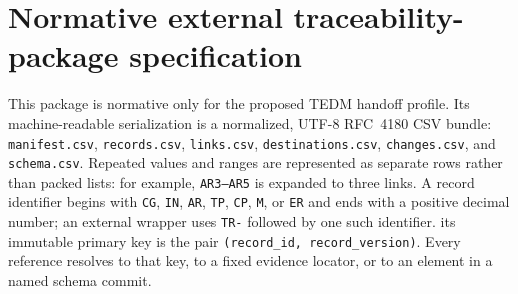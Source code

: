 \documentclass[10pt]{article}
\begin{document}
\clearpage
\section*{Normative external traceability-package specification}
This package is normative only for the proposed TEDM handoff profile. Its
machine-readable serialization is a normalized, UTF-8 RFC~4180 CSV bundle:
\texttt{manifest.csv}, \texttt{records.csv}, \texttt{links.csv},
\texttt{destinations.csv}, \texttt{changes.csv}, and \texttt{schema.csv}.
Repeated values and ranges are represented as separate rows rather than packed
lists: for example, \texttt{AR3--AR5} is expanded to three links. A record
identifier begins with \texttt{CG}, \texttt{IN}, \texttt{AR}, \texttt{TP},
\texttt{CP}, \texttt{M}, or \texttt{ER} and ends with a positive decimal number;
an external wrapper uses \texttt{TR-} followed by one such identifier.
its immutable primary key is the pair
\texttt{(record\_id, record\_version)}. Every reference resolves to that key,
to a fixed evidence locator, or to an element in a named schema commit.
\end{document}

